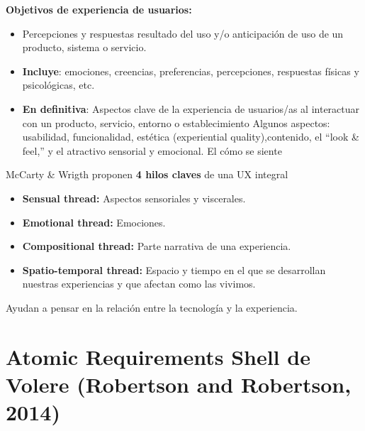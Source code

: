 \documentclass[12pt]{report} %
\begin{document}
\textbf{Objetivos de experiencia de usuarios:}

\begin{itemize}

\item
  Percepciones y respuestas resultado del uso y/o anticipación de uso de
  un producto, sistema o servicio.
\item
\textbf{Incluye}: emociones, creencias, preferencias, percepciones, respuestas
  físicas y psicológicas, etc.
\item
\textbf{En definitiva}: Aspectos clave de la experiencia de usuarios/as al
  interactuar con un producto, servicio, entorno o establecimiento
  Algunos aspectos: usabilidad, funcionalidad, estética (experiential
  quality),contenido, el ``look \& feel,'' y el atractivo sensorial y
  emocional. El cómo se siente
\end{itemize}

McCarty \& Wrigth proponen \textbf{4 hilos claves} de una UX integral

\begin{itemize}

\item
\textbf{Sensual thread:} Aspectos sensoriales y viscerales.
\item
\textbf{Emotional thread:} Emociones.
\item
\textbf{Compositional thread:} Parte narrativa de una experiencia.
\item
\textbf{Spatio-temporal thread:} Espacio y tiempo en el que se desarrollan
  nuestras experiencias y que afectan como las vivimos.
\end{itemize}

Ayudan a pensar en la relación entre la tecnología y la experiencia.

\newpage

\section{Atomic Requirements Shell de Volere (Robertson and
Robertson, 2014)}
\end{document}
